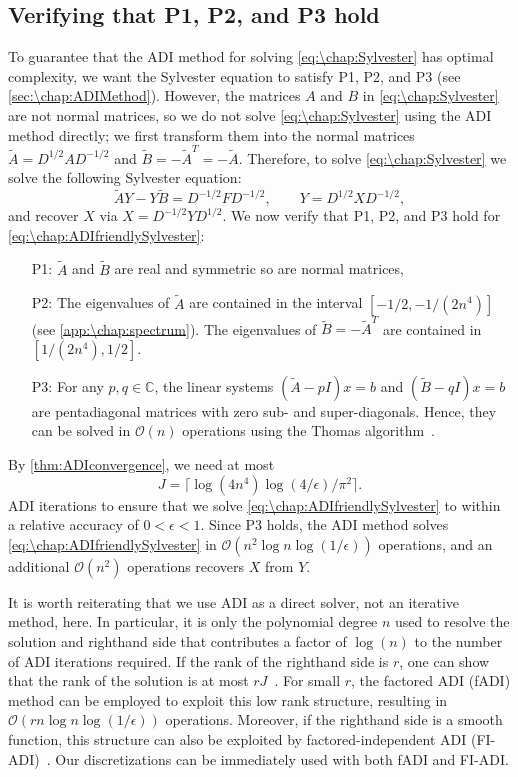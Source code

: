 \subsection{Verifying that P1, P2, and P3 hold}
To guarantee that the ADI method for solving \cref{eq:\chap:Sylvester} has optimal complexity, we want the Sylvester equation to satisfy P1, P2, and P3 (see \cref{sec:\chap:ADIMethod}). 
However, the matrices $A$ and $B$ in \cref{eq:\chap:Sylvester} are not normal matrices, so we do not solve \cref{eq:\chap:Sylvester} using the ADI method directly; we first transform them into the normal matrices $\tilde{A} = D^{1/2}AD^{-1/2}$ and $\tilde{B} = -\tilde{A}^T = - \tilde{A}$. Therefore, to solve \cref{eq:\chap:Sylvester} we solve the following Sylvester equation: 
\begin{equation}
\tilde{A} Y - Y\tilde{B} = D^{-1/2} F D^{-1/2}, \qquad Y = D^{1/2} X D^{-1/2},
\label{eq:\chap:ADIfriendlySylvester}
\end{equation} 
and recover $X$ via $X = D^{-1/2}Y D^{1/2}$.  We now verify that P1, P2, and P3 hold for \cref{eq:\chap:ADIfriendlySylvester}: 
\vspace{1em}
\begin{enumerate}[itemsep=0.5em]
\item[P1:] $\tilde{A}$ and $\tilde{B}$ are real and symmetric so are normal matrices,
\item[P2:] The eigenvalues of $\tilde{A}$ are contained in the interval $[-1/2,-1/(2n^4)]$ (see \cref{app:\chap:spectrum}).  The eigenvalues of $\tilde{B} = -\tilde{A}^T$ are contained in $[1/(2n^4),1/2]$.
\item[P3:] For any $p,q\in\mathbb{C}$, the linear systems $(\tilde{A}-pI)x=b$ and $(\tilde{B}-qI)x=b$ are pentadiagonal matrices with zero sub- and super-diagonals. Hence, they can be solved in $\mathcal{O}(n)$ operations using the Thomas algorithm~\cite[p.~162]{Datta_10_01}.
\end{enumerate}
\vspace{1em}
By \cref{thm:ADIconvergence}, we need at most 
\[
J = \lceil \log(4n^4) \log(4/\epsilon)/\pi^2 \rceil.
\]
ADI iterations to ensure that we solve \cref{eq:\chap:ADIfriendlySylvester} to within a relative accuracy of $0<\epsilon<1$. 
Since P3 holds, the ADI method solves \cref{eq:\chap:ADIfriendlySylvester} in $\mathcal{O}(n^2\log n \log(1/\epsilon))$ operations, and an additional $\mathcal{O}(n^2)$ operations recovers $X$ from $Y$.

It is worth reiterating that we use ADI as a direct solver, not an iterative method, here. In particular, it is only the polynomial degree $n$ used to resolve the solution and righthand side that contributes a factor of $\log(n)$ to the number of ADI iterations required. If the rank of the righthand side is $r$, one can show that the rank of the solution is at most $rJ$~\cite{Benner_09_01}. For small $r$, the factored ADI (fADI) method can be employed to exploit this low rank structure, resulting in $\mathcal{O}(rn\log n \log (1/\epsilon))$ operations. Moreover, if the righthand side is a smooth function, this structure can also be exploited by factored-independent ADI (FI-ADI)~\cite{Townsend_18_02}. Our discretizations can be immediately used with both fADI and FI-ADI.

